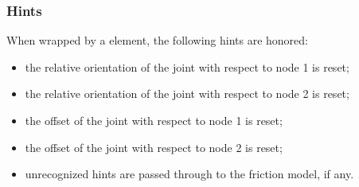 \subsubsection{Hints}
When wrapped by a  element, the following hints are honored:
\begin{itemize}
\item {} the relative orientation of the joint
with respect to node 1 is reset;
\item {} the relative orientation of the joint
with respect to node 2 is reset;
\item {} the offset of the joint
with respect to node 1 is reset;
\item {} the offset of the joint
with respect to node 2 is reset;
\item unrecognized hints are passed through to the friction model,
if any.
\end{itemize}






